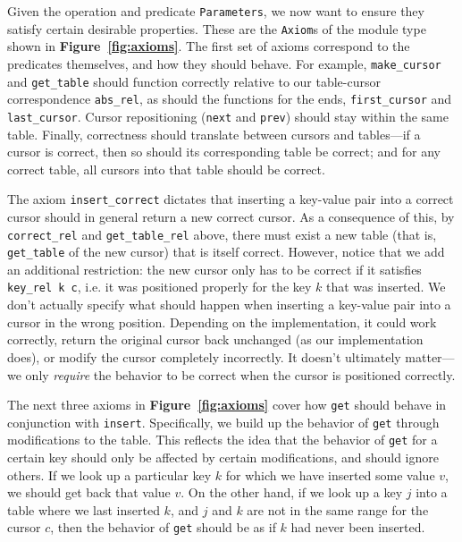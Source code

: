 \documentclass[12pt]{article}
\begin{document}
Given the operation and predicate \texttt{Parameters}, we now want to ensure they satisfy certain desirable properties. These are the \texttt{Axiom}s of the module type shown in \textbf{Figure~\ref{fig:axioms}}. The first set of axioms correspond to the predicates themselves, and how they should behave. For example, \texttt{make\_cursor} and \texttt{get\_table} should function correctly relative to our table-cursor correspondence \texttt{abs\_rel}, as should the functions for the ends, \texttt{first\_cursor} and \texttt{last\_cursor}. Cursor repositioning (\texttt{next} and \texttt{prev}) should stay within the same table. Finally, correctness should translate between cursors and tables---if a cursor is correct, then so should its corresponding table be correct; and for any correct table, all cursors into that table should be correct.

The axiom \texttt{insert\_correct} dictates that inserting a key-value pair into a correct cursor should in general return a new correct cursor. As a consequence of this, by \texttt{correct\_rel} and \texttt{get\_table\_rel} above, there must exist a new table (that is, \texttt{get\_table} of the new cursor) that is itself correct. However, notice that we add an additional restriction: the new cursor only has to be correct if it satisfies \texttt{key\_rel k c}, i.e. it was positioned properly for the key $k$ that was inserted. We don’t actually specify what should happen when inserting a key-value pair into a cursor in the wrong position. Depending on the implementation, it could work correctly, return the original cursor back unchanged (as our implementation does), or modify the cursor completely incorrectly. It doesn’t ultimately matter---we only \textit{require} the behavior to be correct when the cursor is positioned correctly.

The next three axioms in \textbf{Figure~\ref{fig:axioms}} cover how \texttt{get} should behave in conjunction with \texttt{insert}. Specifically, we build up the behavior of \texttt{get} through modifications to the table. This reflects the idea that the behavior of \texttt{get} for a certain key should only be affected by certain modifications, and should ignore others. If we look up a particular key $k$ for which we have inserted some value $v$, we should get back that value $v$. On the other hand, if we look up a key 
$j$ into a table where we last inserted $k$, and $j$ and $k$ are not in the same range for the cursor $c$, then the behavior of \texttt{get} should be as if $k$ had never been inserted.
\end{document}
